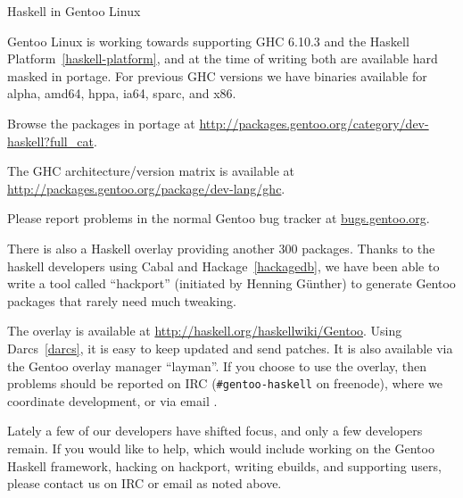 \begin{hcarentry}[updated]{Haskell in Gentoo Linux}
\label{gentoo}
\makeheader

Gentoo Linux is working towards supporting GHC 6.10.3 and the Haskell
Platform~\cref{haskell-platform}, and at the time of writing both are available hard masked in portage.
For previous GHC versions we have binaries available for alpha, amd64, hppa,
ia64, sparc, and x86.

Browse the packages in portage at 
\url{http://packages.gentoo.org/category/dev-haskell?full\_cat}.

The GHC architecture/version matrix is available at
\url{http://packages.gentoo.org/package/dev-lang/ghc}.

Please report problems in the normal Gentoo bug tracker
at \url{bugs.gentoo.org}.

There is also a Haskell overlay providing another 300 packages. Thanks to
the haskell developers using Cabal and Hackage~\cref{hackagedb}, we have been
able to write a tool called ``hackport'' (initiated by Henning G\"unther) to
generate Gentoo packages that rarely need much tweaking.

The overlay is available at
\url{http://haskell.org/haskellwiki/Gentoo}. Using
Darcs~\cref{darcs}, it is easy to keep updated and send patches.
It is also available via the Gentoo overlay manager ``layman''.
If you choose to use the overlay, then problems should be
reported on
IRC (\verb+#gentoo-haskell+ on freenode), where we coordinate
development, or via email .

Lately a few of our developers have shifted focus, and only a few
developers remain. If you would like to help, which would include
working on the Gentoo Haskell framework, hacking on hackport, writing
ebuilds, and supporting users, please contact us on IRC or email as noted
above.
\end{hcarentry}

